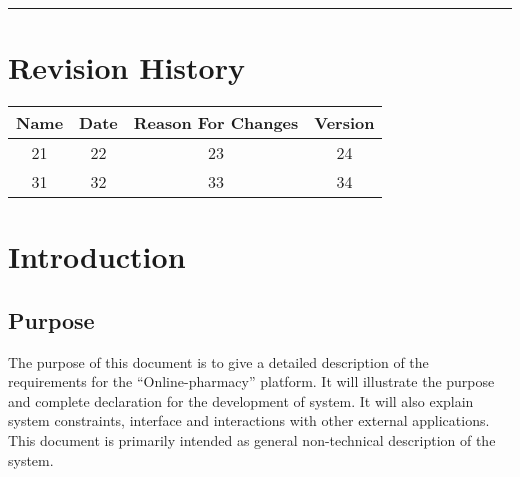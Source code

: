 \documentclass{scrreprt}
\date{}
\def\myversion{1.0 }
\begin{document}
\begin{flushright}
    \rule{16cm}{5pt}\vskip1cm
\end{flushright}

\tableofcontents


\chapter*{Revision History}

\begin{center}
    \begin{tabular}{|c|c|c|c|}
        \hline
	    Name & Date & Reason For Changes & Version\\
        \hline
	    21 & 22 & 23 & 24\\
        \hline
	    31 & 32 & 33 & 34\\
        \hline
    \end{tabular}
\end{center}

\chapter{Introduction}

\section{Purpose}
The purpose of this document is to give a detailed description of the requirements for the “Online-pharmacy” platform. It will illustrate the purpose and complete declaration for the development of system. It will also explain system constraints, interface and interactions with other external applications. This document is primarily intended as general non-technical description of the system. 
\end{document}
